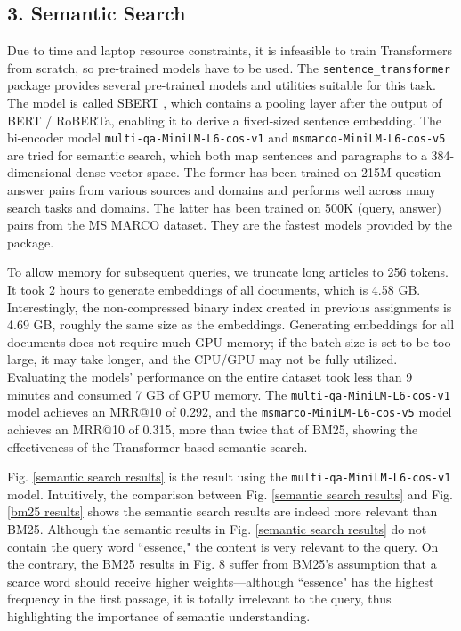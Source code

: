 \documentclass[11pt]{article}
\begin{document}
\hypertarget{3-semantic-search}{%
\subsection{3. Semantic Search}\label{3-semantic-search}}

Due to time and laptop resource constraints, it is infeasible to train Transformers from scratch, so pre-trained models have to be used. The \texttt{sentence\_transformer} package provides several pre-trained models and utilities suitable for this task. The model is called SBERT \cite{c9}, which contains a pooling layer after the output of BERT / RoBERTa, enabling it to derive a fixed-sized sentence embedding. The bi-encoder model \texttt{multi-qa-MiniLM-L6-cos-v1} and \texttt{msmarco-MiniLM-L6-cos-v5} are tried for semantic search, which both map sentences and paragraphs to a 384-dimensional dense vector space. The former has been trained on 215M question-answer pairs from various sources and domains and performs well across many search tasks and domains. The latter has been trained on 500K (query, answer) pairs from the MS MARCO dataset. They are the fastest models provided by the package. \cite{c10}

To allow memory for subsequent queries, we truncate long articles to 256 tokens. It took 2 hours to generate embeddings of all documents, which is 4.58 GB. Interestingly, the non-compressed binary index created in previous assignments is 4.69 GB, roughly the same size as the embeddings. Generating embeddings for all documents does not require much GPU memory; if the batch size is set to be too large, it may take longer, and the CPU/GPU may not be fully utilized. Evaluating the models' performance on the entire dataset took less than 9 minutes and consumed 7 GB of GPU memory. The \texttt{multi-qa-MiniLM-L6-cos-v1} model achieves an MRR@10 of 0.292, and the \texttt{msmarco-MiniLM-L6-cos-v5} model achieves an MRR@10 of 0.315, more than twice that of BM25, showing the effectiveness of the Transformer-based semantic search.

Fig. \ref{semantic search results} is the result using the \texttt{multi-qa-MiniLM-L6-cos-v1} model.
Intuitively, the comparison between Fig. \ref{semantic search results} and
Fig. \ref{bm25 results} shows the semantic
search results are indeed more relevant than BM25. Although the semantic
results in Fig. \ref{semantic search results} do not contain the query word ``essence," the content
is very relevant to the query. On the contrary, the BM25 results in Fig.
8 suffer from BM25's assumption that a scarce word should receive higher
weights---although ``essence" has the highest frequency in the first
passage, it is totally irrelevant to the query, thus highlighting the
importance of semantic understanding.
\end{document}
